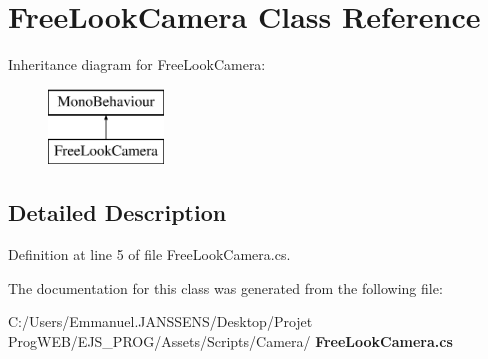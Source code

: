 \section{Free\+Look\+Camera Class Reference}
\label{class_free_look_camera}
Inheritance diagram for Free\+Look\+Camera\+:\begin{figure}[H]
\begin{center}
\leavevmode
\includegraphics[height=2.000000cm]{class_free_look_camera}
\end{center}
\end{figure}


\subsection{Detailed Description}


Definition at line 5 of file Free\+Look\+Camera.\+cs.



The documentation for this class was generated from the following file\+:\begin{DoxyCompactItemize}
\item 
C\+:/\+Users/\+Emmanuel.\+J\+A\+N\+S\+S\+E\+N\+S/\+Desktop/\+Projet Prog\+W\+E\+B/\+E\+J\+S\+\_\+\+P\+R\+O\+G/\+Assets/\+Scripts/\+Camera/\textbf{ Free\+Look\+Camera.\+cs}\end{DoxyCompactItemize}
